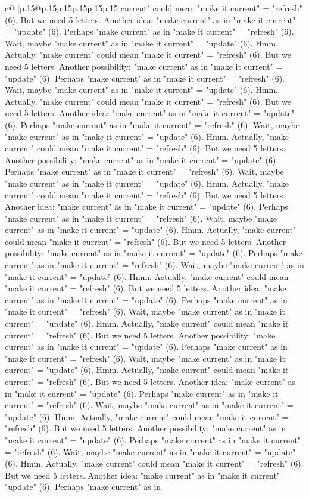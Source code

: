\documentclass{article}
\begin{document}
{\begin{supertabular}{c@{$\;$}|p{.15\linewidth}@{}p{.15\linewidth}p{.15\linewidth}p{.15\linewidth}p{.15\linewidth}p{.15\linewidth}}
{{{current" could mean "make it current" = "refresh" (6). But we need 5 letters. Another idea: "make current" as in "make it current" = "update" (6). Perhaps "make current" as in "make it current" = "refresh" (6). Wait, maybe "make current" as in "make it current" = "update" (6). Hmm. Actually, "make current" could mean "make it current" = "refresh" (6). But we need 5 letters. Another possibility: "make current" as in "make it current" = "update" (6). Perhaps "make current" as in "make it current" = "refresh" (6). Wait, maybe "make current" as in "make it current" = "update" (6). Hmm. Actually, "make current" could mean "make it current" = "refresh" (6). But we need 5 letters. Another idea: "make current" as in "make it current" = "update" (6). Perhaps "make current" as in "make it current" = "refresh" (6). Wait, maybe "make current" as in "make it current" = "update" (6). Hmm. Actually, "make current" could mean "make it current" = "refresh" (6). But we need 5 letters. Another possibility: "make current" as in "make it current" = "update" (6). Perhaps "make current" as in "make it current" = "refresh" (6). Wait, maybe "make current" as in "make it current" = "update" (6). Hmm. Actually, "make current" could mean "make it current" = "refresh" (6). But we need 5 letters. Another idea: "make current" as in "make it current" = "update" (6). Perhaps "make current" as in "make it current" = "refresh" (6). Wait, maybe "make current" as in "make it current" = "update" (6). Hmm. Actually, "make current" could mean "make it current" = "refresh" (6). But we need 5 letters. Another possibility: "make current" as in "make it current" = "update" (6). Perhaps "make current" as in "make it current" = "refresh" (6). Wait, maybe "make current" as in "make it current" = "update" (6). Hmm. Actually, "make current" could mean "make it current" = "refresh" (6). But we need 5 letters. Another idea: "make current" as in "make it current" = "update" (6). Perhaps "make current" as in "make it current" = "refresh" (6). Wait, maybe "make current" as in "make it current" = "update" (6). Hmm. Actually, "make current" could mean "make it current" = "refresh" (6). But we need 5 letters. Another possibility: "make current" as in "make it current" = "update" (6). Perhaps "make current" as in "make it current" = "refresh" (6). Wait, maybe "make current" as in "make it current" = "update" (6). Hmm. Actually, "make current" could mean "make it current" = "refresh" (6). But we need 5 letters. Another idea: "make current" as in "make it current" = "update" (6). Perhaps "make current" as in "make it current" = "refresh" (6). Wait, maybe "make current" as in "make it current" = "update" (6). Hmm. Actually, "make current" could mean "make it current" = "refresh" (6). But we need 5 letters. Another possibility: "make current" as in "make it current" = "update" (6). Perhaps "make current" as in "make it current" = "refresh" (6). Wait, maybe "make current" as in "make it current" = "update" (6). Hmm. Actually, "make current" could mean "make it current" = "refresh" (6). But we need 5 letters. Another idea: "make current" as in "make it current" = "update" (6). Perhaps "make current" as in }}}
\end{supertabular}}
\end{document}
